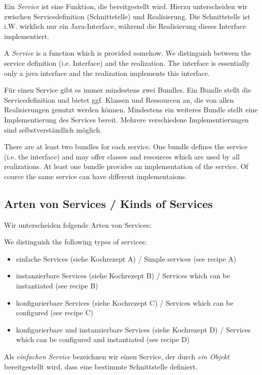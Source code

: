 \documentclass[10pt,a4paper]{scrartcl}
\providecommand{\deng}[2]{#1 / {\sffamily #2}}
\providecommand{\deutsch}[1]{#1}
\providecommand{\englisch}[1]{{\sffamily #1}}
\begin{document}
\deutsch{Ein \emph{Service} ist eine Funktion, die bereitgestellt wird. Hierzu
unterscheiden wir zwischen Servicedefinition (Schnittstelle) und Realisierung.
Die Schnittstelle ist i.W. wirklich nur ein Java-Interface, während die
Realisierung dieses Interface implementiert.}

\englisch{A \emph{Service} is a function which is provided somehow. We
distinguish between the service definition (i.e. Interface) and the realization.
The interface is essentially only a java interface and the realization
implements this interface.}

\deutsch{Für einen Service gibt es immer mindestens zwei Bundles. Ein Bundle
stellt die Servicedefinition und bietet ggf. Klassen und Ressourcen an, die von
allen Realisierungen genutzt werden können. Mindestens ein weiteres Bundle
stellt eine Implementierung des Services bereit. Mehrere verschiedene
Implementierungen sind selbstverständlich möglich.}

\englisch{There are at least two bundles for each service. One bundle defines
the service (i.e. the interface) and may offer classes and resources which are
used by all realizations. At least one bundle provides an implementation of the
service. Of cource the same service can have different implementaions.}

\subsection{\deng{Arten von Services}{Kinds of Services}}
\label{service-arten}
\deutsch{Wir unterscheiden folgende Arten von Services:}

\englisch{We distinguish the following types of services:}

\begin{itemize}
 \item \deng{einfache Services (siehe Kochrezept A)}{Simple services (see recipe A)}
 \item \deng{instanzierbare Services (siehe Kochrezept B)}{Services which can be instantiated (see recipe B)}
 \item \deng{konfigurierbare Services (siehe Kochrezept C)}{Services which can be configured (see recipe C)}
 \item \deng{konfigurierbare und instanzierbare Services (siehe Kochrezept D)}{Services which can be configured and instantiated (see recipe D)}
\end{itemize}

\deutsch{Als \emph{einfachen Service} bezeichnen wir einen Service, der durch \emph{ein Objekt}
bereitgestellt wird, dass eine bestimmte Schnittstelle definiert.}
\end{document}
